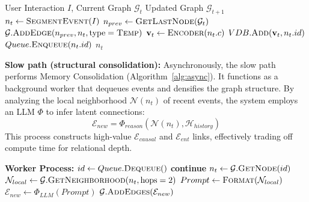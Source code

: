 \documentclass[11pt]{article}
\newcommand{\Func}[1]{\textsc{#1}}
\begin{document}
\begin{algorithm}[!t]
\caption{Fast Path: Synaptic Ingestion}
\label{alg:ingest}
\begin{algorithmic}[1]
\small
\Require User Interaction $I$, Current Graph $\mathcal{G}_t$
\Ensure Updated Graph $\mathcal{G}_{t+1}$
\State $n_t \leftarrow \Func{SegmentEvent}(I)$
\State $n_{prev} \leftarrow \Func{GetLastNode}(\mathcal{G}_t)$
\State {}
\State $\mathcal{G}.\Func{AddEdge}(n_{prev}, n_t, \text{type}=\textsc{Temp})$
\State {}
\State $\mathbf{v}_t \leftarrow \Func{Encoder}(n_t.c)$
\State $VDB.\Func{Add}(\mathbf{v}_t, n_t.id)$
\State $Queue.\Func{Enqueue}(n_t.id)$ 
\State \Return $n_t$
\end{algorithmic}
\end{algorithm}



\noindent\textbf{Slow path (structural consolidation):}
Asynchronously, the slow path performs Memory Consolidation (Algorithm~\ref{alg:async}). It functions as a background worker that dequeues events and densifies the graph structure. By analyzing the local neighborhood $\mathcal{N}(n_t)$ of recent events, the system employs an LLM $\Phi$ to infer latent connections:
\begin{equation}
    \mathcal{E}_{new} = \Phi_{reason}(\mathcal{N}(n_t), \mathcal{H}_{history})
\end{equation}
This process constructs high-value $\mathcal{E}_{causal}$ and $\mathcal{E}_{ent}$ links, effectively trading off compute time for relational depth.





\begin{algorithm}[!t]
\caption{Slow Path: Structural Consolidation}
\label{alg:async}
\begin{algorithmic}[1]
\small
\State \textbf{Worker Process:}
\Loop
    \State $id \leftarrow Queue.\Func{Dequeue}()$
     \textbf{continue} \EndIf
    \State $n_t \leftarrow \mathcal{G}.\Func{GetNode}(id)$
    \State $\mathcal{N}_{local} \leftarrow \mathcal{G}.\Func{GetNeighborhood}(n_t, \text{hops}=2)$
    \State {}
    \State $Prompt \leftarrow \Func{Format}(\mathcal{N}_{local})$
    \State $\mathcal{E}_{new} \leftarrow \Phi_{LLM}(Prompt)$
    \State $\mathcal{G}.\Func{AddEdges}(\mathcal{E}_{new})$
\EndLoop
\end{algorithmic}
\end{algorithm}
\end{document}
